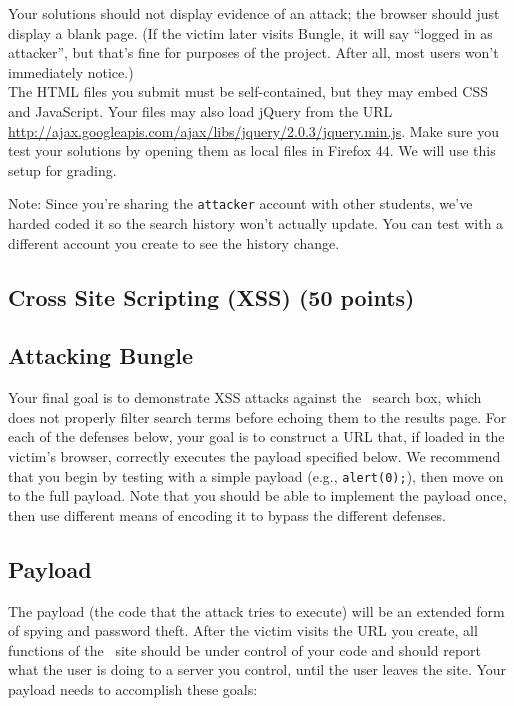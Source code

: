 \documentclass[letterpaper,12pt]{report}
\newcommand{\firefox}{Firefox 44}
\newcommand{\jquery}{http://ajax.googleapis.com/ajax/libs/jquery/2.0.3/jquery.min.js}
\begin{document}
Your solutions should not display evidence of an attack; the browser should just display a blank page.  (If the victim later visits Bungle, it will say ``logged in as attacker'', but that's fine for purposes of the project.  After all, most users won't immediately notice.)\\
The HTML files you submit must be self-contained, but they may embed CSS and JavaScript.  Your files may also load jQuery from the URL \url{\jquery}.  Make sure you test your solutions by opening them as local files in \firefox. We will use this setup for grading.

\medskip

Note: Since you're sharing the \texttt{attacker} account with other students, we've harded coded it so the search history won't actually update.  You can test with a different account you create to see the history change.

\pagebreak

\subsection{Cross Site Scripting (XSS) (50 points)}
\label{sec:xss}

\subsection*{Attacking Bungle}
Your final goal is to demonstrate XSS attacks against the \bungle\ search box, which does not properly filter search terms before echoing them to the results page.  For each of the defenses below, your goal is to construct a URL that, if loaded in the victim's browser, correctly executes the payload specified below.  We recommend that you begin by testing with a simple payload (e.g., \texttt{alert(0);}), then move on to the full payload.  Note that you should be able to implement the payload once, then use different means of encoding it to bypass the different defenses.

\subsection*{Payload}
The payload (the code that the attack tries to execute) will be an extended form of spying and password theft.  After the victim visits the URL you create, all functions of the \bungle\ site should be under control of your code and should report what the user is doing to a server you control, until the user leaves the site.  Your payload needs to accomplish these goals:
\bigskip
\end{document}
